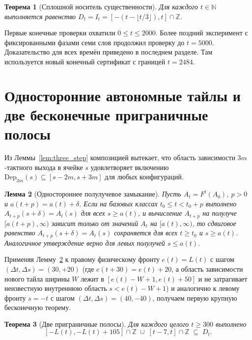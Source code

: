\documentclass[11pt, a4paper]{article}
\newtheorem{theorem}{Теорема}[section]
\newtheorem{lemma}[theorem]{Лемма}
\begin{document}
\begin{theorem}[Сплошной носитель существенности]\label{conj:gap_free}
Для каждого $t \in \mathbb{N}$ выполняется равенство $D_t = I_t = [-(t - \lfloor t/3 \rfloor), t] \cap \mathbb{Z}$.
\end{theorem}

Первые конечные проверки охватили $0\le t\le2000$. Более поздний эксперимент с фиксированными фазами семи слов продолжил проверку до $t=5000$. Доказательство для всех времён приведено в последнем разделе. Там используется новый конечный сертификат с границей $t=2484$.

\section{Односторонние автономные тайлы и две бесконечные приграничные полосы}

Из Леммы~\ref{lem:three_step} композицией вытекает, что область зависимости $3m$-тактного выхода в ячейке $s$ удовлетворяет включению $\mathrm{Dep}_{3m}(s) \subseteq [s - 2m, s + 3m]$ для любых конфигураций.

\begin{lemma}[Одностороннее полулучевое замыкание]\label{lem:one_sided}
Пусть $A_t = F^t(A_0)$, $p > 0$ и $a(t + p) = a(t) + \delta$. Если на базовых классах $t_0 \le t < t_0 + p$ выполнено $A_{t+p}(s + \delta) = A_t(s)$ для всех $s \ge a(t)$, и вычисление $A_{t+p}$ на полулуче $[a(t+p), \infty)$ зависит только от значений $A_t$ на $[a(t), \infty)$, то сдвиговое равенство $A_{t+p}(s + \delta) = A_t(s)$ сохраняется для всех $t \ge t_0$ и $s \ge a(t)$. Аналогичное утверждение верно для левых полулучей $s \le a(t)$.
\end{lemma}

Применяя Лемму~\ref{lem:one_sided} к правому физическому фронту $e(t) = L(t)$ с шагом $(\Delta t, \Delta s) = (30, +20)$ (где $e(t+30) = e(t) + 20$, а область зависимости нового тайла ширины $W$ лежит в $[e(t) - W + 1, e(t) + 50]$ и не затрагивает неизвестную внутреннюю область $s < e(t) - W + 1$) и аналогично к левому фронту $s = -t$ с шагом $(\Delta t, \Delta s) = (40,-40)$, получаем первую крупную бесконечную теорему.

\begin{theorem}[Две приграничные полосы]\label{thm:dual_strips}
Для каждого целого $t \ge 300$ выполнено
\begin{equation}\label{eq:dual_strips}
[-L(t), -L(t) + 105] \cap \mathbb{Z} \;\cup\; [t - 7, t] \cap \mathbb{Z} \;\subseteq\; D_t.
\end{equation}
\end{theorem}
\end{document}
